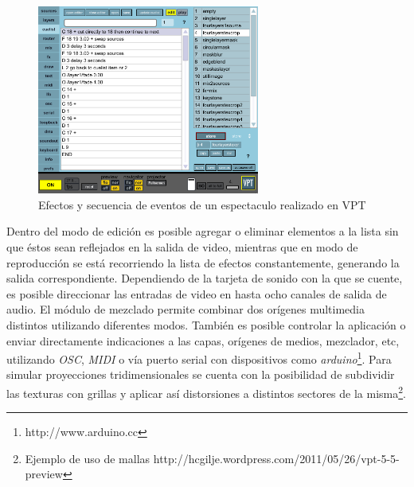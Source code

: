 \begin{figure}[H]
  \centering
    \includegraphics[width=0.65\textwidth]{./Apendices/Cap3_aplicaciones/apps-vpt-cuelist.png}
  \caption[http://hcgilje.wordpress.com/VPT]{Efectos y secuencia de eventos de un espectaculo realizado en VPT}
  \label{fig:Apps-VPTCuelist}
\end{figure}

Dentro del modo de edición es posible agregar o eliminar elementos a la lista sin que éstos sean reflejados en la salida de video, mientras que en modo de reproducción se está recorriendo la lista de efectos constantemente, generando la salida correspondiente.
Dependiendo de la tarjeta de sonido con la que se cuente, es posible direccionar las entradas de video en hasta ocho canales de salida de audio. El módulo de mezclado permite combinar dos orígenes multimedia distintos utilizando diferentes modos. También es posible controlar la aplicación o enviar directamente indicaciones a las capas, orígenes de medios, mezclador, etc, utilizando \emph{OSC}, \emph{MIDI} o vía puerto serial con dispositivos como \emph{arduino}\footnote{http://www.arduino.cc}.
Para simular proyecciones tridimensionales se cuenta con la posibilidad de subdividir las texturas con grillas y aplicar así distorsiones a distintos sectores de la misma\footnote{Ejemplo de uso de mallas http://hcgilje.wordpress.com/2011/05/26/vpt-5-5-preview}.
